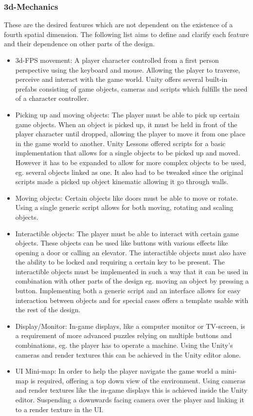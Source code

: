 \subsubsection{3d-Mechanics}
These are the desired features which are not dependent on the existence of a fourth spatial dimension. 
The following list aims to define and clarify each feature and their dependence on other parts of the design.
\begin{itemize}
	\item 3d-FPS movement: A player character controlled from a first person perspective using the keyboard and mouse. Allowing the player to traverse, perceive and interact with the game world. Unity offers several built-in prefabs consisting of game objects, cameras and scripts which fulfills the need of a character controller.
	\item Picking up and moving objects: The player must be able to pick up certain game objects. When an object is picked up, it must be held in front of the player character until dropped, allowing the player to move it from one place in the game world to another. Unity Lessons\cite{unityLessons} offered scripts for a basic implementation that allows for a single objects to be picked up and moved. However it has to be expanded to allow for more complex objects to be used, eg. several objects linked as one. It also had to be tweaked since the original scripts made a picked up object kinematic allowing it go through walls.  
	\item Moving objects: Certain objects like doors must be able to move or rotate. Using a single generic script allows for both moving, rotating and scaling objects. 
	\item Interactible objects: The player must be able to interact with certain game objects. These objects can be used like buttons with various effects like opening a door or calling an elevator. The interactible objects must also have the ability to be locked and requiring a certain key to be present. The interactible objects must be implemented in such a way that it can be used in combination with other parts of the design eg. moving an object by pressing a button. Implementing both a generic script and an interface allows for easy interaction between objects and for special cases offers a template usable with the rest of the design.
	\item Display/Monitor: In-game displays, like a computer monitor or TV-screen, is a requirement of more advanced puzzles relying on multiple buttons and combinations, eg. the player has to operate a machine. Using the Unity's cameras and render textures this can be achieved in the Unity editor alone. 
	\item UI Mini-map: In order to help the player navigate the game world a mini-map is required, offering a top down view of the environment. Using cameras and render textures like the in-game displays this is achieved inside the Unity editor. Suspending a downwards facing camera over the player and linking it to a render texture in the UI.  
	
\end{itemize}
